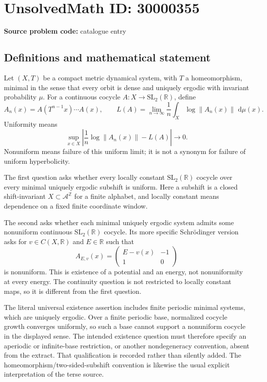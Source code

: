\documentclass[11pt]{article}
\newcommand{\Z}{\mathbb{Z}}
\newcommand{\R}{\mathbb{R}}
\newcommand{\dd}{\,\mathrm{d}}
\begin{document}
\section*{UnsolvedMath ID: 30000355}
\textbf{Source problem code:} catalogue entry
\subsection{Definitions and mathematical statement}
Let $(X,T)$ be a compact metric dynamical system, with $T$ a homeomorphism, minimal in the sense that every orbit is dense and uniquely ergodic with invariant probability $\mu$. For a continuous cocycle $A:X\to\mathrm{SL}_2(\R)$, define
\[
 A_n(x)=A(T^{n-1}x)\cdots A(x),\qquad
 L(A)=\lim_{n\to\infty}\frac1n\int_X\log\|A_n(x)\|\,\dd\mu(x).
\]
Uniformity means
\[
 \sup_{x\in X}\left|\frac1n\log\|A_n(x)\|-L(A)\right|\longrightarrow0.
\]
Nonuniform means failure of this uniform limit; it is not a synonym for failure of uniform hyperbolicity.

The first question asks whether every locally constant $\mathrm{SL}_2(\R)$ cocycle over every minimal uniquely ergodic subshift is uniform. Here a subshift is a closed shift-invariant $X\subset\mathcal A^{\Z}$ for a finite alphabet, and locally constant means dependence on a fixed finite coordinate window.

The second asks whether each minimal uniquely ergodic system admits some nonuniform continuous $\mathrm{SL}_2(\R)$ cocycle. Its more specific Schr\"odinger version asks for $v\in C(X,\R)$ and $E\in\R$ such that
\[
 A_{E,v}(x)=\begin{pmatrix}E-v(x)&-1\\1&0\end{pmatrix}
\]
is nonuniform. This is existence of a potential and an energy, not nonuniformity at every energy. The continuity question is not restricted to locally constant maps, so it is different from the first question.

The literal universal existence assertion includes finite periodic minimal systems, which are uniquely ergodic. Over a finite periodic base, normalized cocycle growth converges uniformly, so such a base cannot support a nonuniform cocycle in the displayed sense. The intended existence question must therefore specify an aperiodic or infinite-base restriction, or another nondegeneracy convention, absent from the extract. That qualification is recorded rather than silently added. The homeomorphism/two-sided-subshift convention is likewise the usual explicit interpretation of the terse source.
\end{document}
